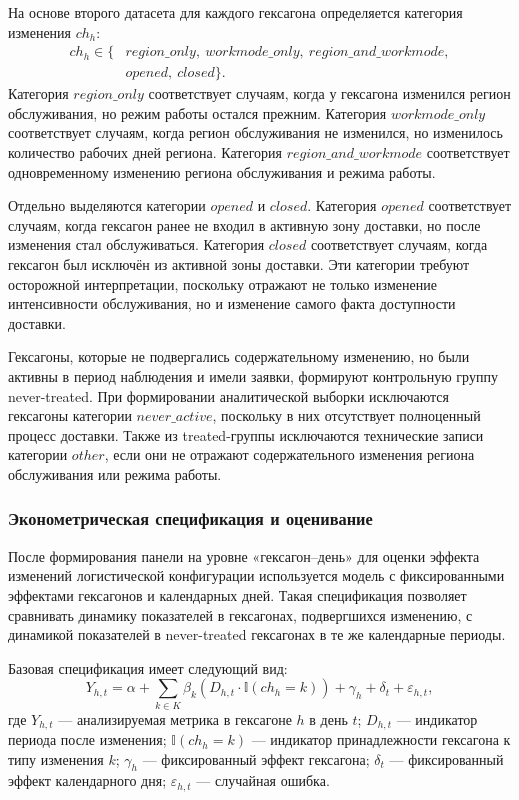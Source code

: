 \documentclass[14pt,a4paper]{extarticle}
\begin{document}
На основе второго датасета для каждого гексагона определяется категория изменения \(ch_h\):
\[
\begin{aligned}
ch_h \in \{& region\_only,\ workmode\_only,\ region\_and\_workmode,\\
& opened,\ closed\}.
\end{aligned}
\]
Категория \(region\_only\) соответствует случаям, когда у гексагона изменился регион обслуживания, но режим работы остался прежним. Категория \(workmode\_only\) соответствует случаям, когда регион обслуживания не изменился, но изменилось количество рабочих дней региона. Категория \(region\_and\_workmode\) соответствует одновременному изменению региона обслуживания и режима работы.

Отдельно выделяются категории \(opened\) и \(closed\). Категория \(opened\) соответствует случаям, когда гексагон ранее не входил в активную зону доставки, но после изменения стал обслуживаться. Категория \(closed\) соответствует случаям, когда гексагон был исключён из активной зоны доставки. Эти категории требуют осторожной интерпретации, поскольку отражают не только изменение интенсивности обслуживания, но и изменение самого факта доступности доставки.

Гексагоны, которые не подвергались содержательному изменению, но были активны в период наблюдения и имели заявки, формируют контрольную группу never-treated. При формировании аналитической выборки исключаются гексагоны категории \(never\_active\), поскольку в них отсутствует полноценный процесс доставки. Также из treated-группы исключаются технические записи категории \(other\), если они не отражают содержательного изменения региона обслуживания или режима работы.

\subsubsection{Эконометрическая спецификация и оценивание}

После формирования панели на уровне «гексагон--день» для оценки эффекта изменений логистической конфигурации используется модель с фиксированными эффектами гексагонов и календарных дней. Такая спецификация позволяет сравнивать динамику показателей в гексагонах, подвергшихся изменению, с динамикой показателей в never-treated гексагонах в те же календарные периоды.

Базовая спецификация имеет следующий вид:
\[
Y_{h,t}
=
\alpha
+
\sum_{k \in K}
\beta_k
\left(
D_{h,t} \cdot \mathbb{I}(ch_h=k)
\right)
+
\gamma_h
+
\delta_t
+
\varepsilon_{h,t},
\]
где \(Y_{h,t}\) --- анализируемая метрика в гексагоне \(h\) в день \(t\); \(D_{h,t}\) --- индикатор периода после изменения; \(\mathbb{I}(ch_h=k)\) --- индикатор принадлежности гексагона к типу изменения \(k\); \(\gamma_h\) --- фиксированный эффект гексагона; \(\delta_t\) --- фиксированный эффект календарного дня; \(\varepsilon_{h,t}\) --- случайная ошибка.
\end{document}
